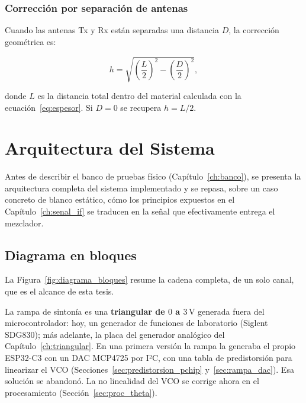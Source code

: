 \documentclass[12pt, a4paper, twoside]{report}
\begin{document}
\subsection{Corrección por separación de antenas}
\label{sub:correccion_antenas}

Cuando las antenas Tx y Rx están separadas una distancia $D$, la
corrección geométrica es:

\begin{equation}
  h = \sqrt{\!\left(\frac{L}{2}\right)^{\!2} - \left(\frac{D}{2}\right)^{\!2}},
  \label{eq:correccion_D}
\end{equation}

donde $L$ es la distancia total dentro del material calculada con la
ecuación~\eqref{eq:espesor}. Si $D = 0$ se recupera $h = L/2$.

\chapter{Arquitectura del Sistema}
\label{ch:arquitectura}

Antes de describir el banco de pruebas físico (Capítulo~\ref{ch:banco}), se
presenta la arquitectura completa del sistema implementado y se repasa,
sobre un caso concreto de blanco estático, cómo los principios expuestos en
el Capítulo~\ref{ch:senal_if} se traducen en la señal que efectivamente
entrega el mezclador.

\section{Diagrama en bloques}
\label{sec:diagrama_bloques}

La Figura~\ref{fig:diagrama_bloques} resume la cadena completa, de un solo
canal, que es el alcance de esta tesis.

La rampa de sintonía es una \textbf{triangular de $0$ a $3\,\text{V}$}
generada fuera del microcontrolador: hoy, un generador de funciones de
laboratorio (Siglent SDG830); más adelante, la placa del generador analógico
del Capítulo~\ref{ch:triangular}. En una primera versión la rampa la
generaba el propio ESP32-C3 con un DAC MCP4725 por I²C, con una tabla de
predistorsión para linearizar el VCO (Secciones~\ref{sec:predistorsion_pchip}
y~\ref{sec:rampa_dac}). Esa solución se abandonó. La no linealidad del VCO se
corrige ahora en el procesamiento (Sección~\ref{sec:proc_theta}).
\end{document}
